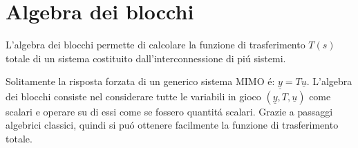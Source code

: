 \documentclass[../main.tex]{subfiles}
\begin{document}
	\newcommand{\T}[1]{T^{(#1)}(s)}
	
	\section{Algebra dei blocchi}
		L'algebra dei blocchi permette di calcolare la funzione di trasferimento $ T(s) $ totale di un sistema costituito dall'interconnessione di pi\'u sistemi.
		
		Solitamente la risposta forzata di un generico sistema MIMO \'e: $ \underline{y} = T \underline{u} $. L'algebra dei blocchi consiste nel considerare tutte le variabili in gioco $ (\underline{y}, T, \underline{u}) $ come scalari e operare su di essi come se fossero quantit\'a scalari. Grazie a passaggi algebrici classici, quindi si pu\'o ottenere facilmente la funzione di trasferimento totale. 
	
\end{document}
